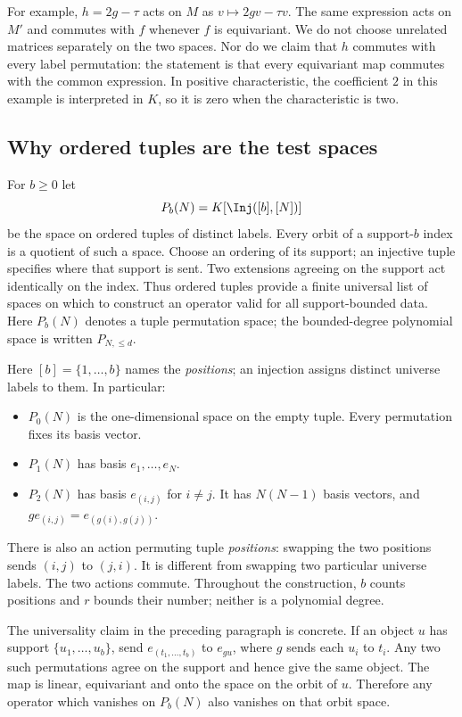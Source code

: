 For example, $h=2g-\tau$ acts on $M$ as
$v\mapsto2g v-\tau v$. The same expression acts on $M'$ and
commutes with $f$ whenever $f$ is equivariant. We do not choose
unrelated matrices separately on the two spaces. Nor do we claim
that $h$ commutes with every label permutation: the statement is
that every equivariant map commutes with the common expression.
In positive characteristic, the coefficient $2$ in this example is
interpreted in $K$, so it is zero when the characteristic is two.

\subsection*{Why ordered tuples are the test spaces}
For $b\ge0$ let
\[
                 P_b(N)=K[\Inj([b],[N])]
\]
be the space on ordered tuples of distinct labels. Every orbit of a
support-$b$ index is a quotient of such a space. Choose an ordering of
its support; an injective tuple specifies where that support is sent.
Two extensions agreeing on the support act identically on the index.
Thus ordered tuples provide a finite universal list of spaces on which
to construct an operator valid for all support-bounded data.
Here $P_b(N)$ denotes a tuple permutation space; the bounded-degree
polynomial space is written $P_{N,\le d}$.

Here $[b]=\{1,\ldots,b\}$ names the \emph{positions}; an injection
assigns distinct universe labels to them. In particular:
\begin{itemize}
\item $P_0(N)$ is the one-dimensional space on the empty tuple.
Every permutation fixes its basis vector.
\item $P_1(N)$ has basis $e_1,\ldots,e_N$.
\item $P_2(N)$ has basis $e_{(i,j)}$ for $i\ne j$. It has
$N(N-1)$ basis vectors, and $g e_{(i,j)}=e_{(g(i),g(j))}$.
\end{itemize}
There is also an action permuting tuple \emph{positions}: swapping
the two positions sends $(i,j)$ to $(j,i)$. It is different from
swapping two particular universe labels. The two actions commute.
Throughout the construction, $b$ counts positions and $r$ bounds
their number; neither is a polynomial degree.

The universality claim in the preceding paragraph is concrete. If an
object $u$ has support $\{u_1,\ldots,u_b\}$, send
$e_{(t_1,\ldots,t_b)}$ to $e_{g u}$, where $g$ sends each $u_i$
to $t_i$. Any two such permutations agree on the support and hence
give the same object. The map is linear, equivariant and onto the
space on the orbit of $u$. Therefore any operator which vanishes on
$P_b(N)$ also vanishes on that orbit space.

